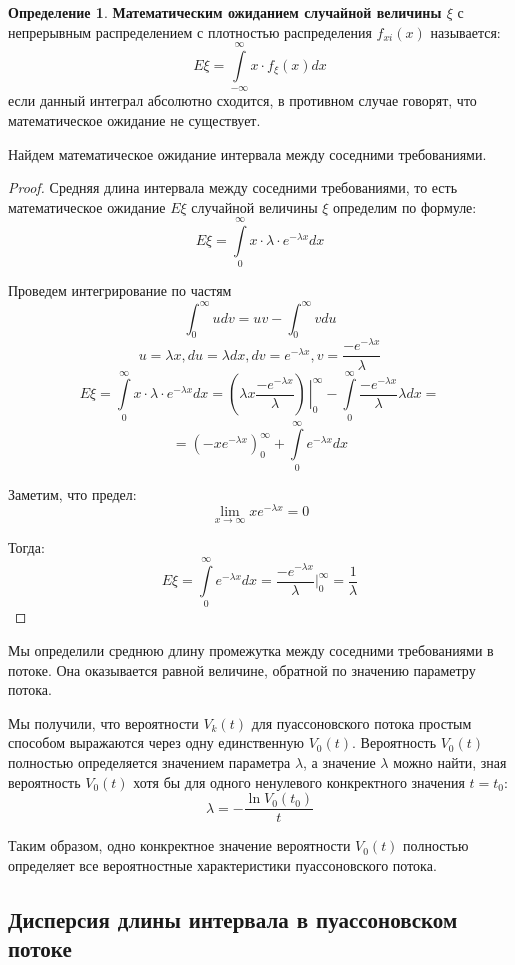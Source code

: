 \documentclass[aps,%
12pt,%
final,%
oneside,
onecolumn,%
musixtex, %
superscriptaddress,%
centertags]{article} %
\theoremstyle{plain}
\theoremstyle{definition}
\newtheorem{definition}{Определение}[subsection]
\theoremstyle{remark}
\begin{document}
\begin{definition}
 	\textbf{Математическим ожиданием случайной величины $\xi$} с непрерывным распределением с плотностью распределения $f_{xi}(x)$ называется:
	$$ E\xi = \int\limits_{-\infty}^{\infty} x\cdot f_{\xi}(x)dx$$
	если данный интеграл абсолютно сходится, в противном случае говорят, что математическое ожидание не существует.
\end{definition} 

Найдем математическое ожидание интервала между соседними требованиями.

\begin{proof}
	Средняя длина интервала между соседними требованиями, то есть математическое ожидание $E\xi$ случайной величины $\xi$ определим по формуле:
	$$E\xi =  \int\limits_{0}^{\infty} x\cdot \lambda \cdot e^{-\lambda x}dx$$

	Проведем интегрирование по частям
	$$ \int_{0}^{\infty} udv = uv - \int_{0}^{\infty} vdu$$
	$$ u = \lambda x, du = \lambda dx, dv = e^{-\lambda x}, v = \frac{-e^{-\lambda x}}{\lambda}$$
	$$E\xi =  \int\limits_{0}^{\infty} x\cdot \lambda \cdot e^{-\lambda x}dx = \left(\lambda x \frac{-e^{-\lambda x}}{\lambda}\right)\left. \frac{}{}\right|_0^{\infty} - \int\limits_0^{\infty} \frac{-e^{-\lambda x}}{\lambda}\lambda dx = $$
	$$ = \left(-xe^{-\lambda x}\right)_0^{\infty} + \int\limits_0^{\infty} e^{-\lambda x} dx$$

	Заметим, что предел:
	$$\lim\limits_{x \to \infty} xe^{-\lambda x} = 0$$

	Тогда:
	$$E\xi = \int\limits_0^{\infty} e^{-\lambda x} dx = \frac{-e^{-\lambda x}}{\lambda} |_0^{\infty} = \frac{1}{\lambda}$$
\end{proof}

Мы определили среднюю длину промежутка между соседними требованиями в потоке. Она оказывается равной величине, обратной по значению параметру потока.

Мы получили, что вероятности $V_k(t)$ для пуассоновского потока простым способом выражаются через одну единственную $V_0(t)$. Вероятность $V_0(t)$ полностью определяется значением параметра $\lambda$, а значение $\lambda$ можно найти, зная вероятность $V_0(t)$ хотя бы для одного ненулевого конкректного значения $t=t_0$:
$$\lambda = - \frac{\ln V_0(t_0)}{t}$$

Таким образом, одно конкректное значение вероятности $V_0(t)$ полностью определяет все вероятностные характеристики пуассоновского потока.

\newpage
\subsection{Дисперсия длины интервала в пуассоновском потоке}
\end{document}
